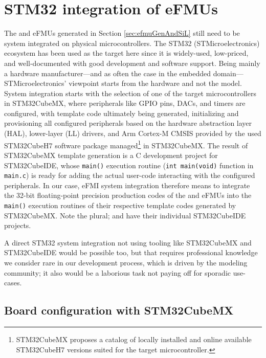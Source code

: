 \section{STM32 integration of eFMUs}\label{sec:STM32-integration-of-eFMUs}

The \controller{} and \plant{} eFMUs generated in Section \ref{sec:efmuGenAndSiL} still need to be system integrated on physical microcontrollers. The STM32 (STMicroelectronics\regtm{}) ecosystem has been used as the target here since it is widely-used, low-priced, and well-documented with good development and software support. Being mainly a hardware manufacturer---and as often the case in the embedded domain---STMicroelectronics' viewpoint starts from the hardware and not the model. System integration starts with the selection of one of the target microcontrollers in STM32CubeMX, where peripherals like GPIO pins, DACs, and timers are configured, with template code ultimately being generated, initializing and provisioning all configured peripherals based on the hardware abstraction layer (HAL), lower-layer (LL) drivers, and Arm\regtm{} Cortex\regtm{}-M CMSIS provided by the used STM32CubeH7 software package managed\footnote{STM32CubeMX proposes a catalog of locally installed and online available STM32CubeH7 versions suited for the target microcontroller.} in STM32CubeMX. The result of STM32CubeMX template generation is a C development project for STM32CubeIDE, whose \texttt{main()} execution routine (\texttt{int main(void)} function in \texttt{main.c}) is ready for adding the actual user-code interacting with the configured peripherals. In our case, eFMI system integration therefore means to integrate the 32-bit floating-point precision production codes of the \controller{} and \plant{} eFMUs into the \texttt{main()} execution routines of their respective template codes generated by STM32CubeMX. Note the plural; \controller{} and \plant{} have their individual STM32CubeIDE projects.

A direct STM32 system integration not using tooling like STM32CubeMX and STM32CubeIDE would be possible too, but that requires professional knowledge we consider rare in our development process, which is driven by the modeling community; it also would be a laborious task not paying off for sporadic use-cases.

\subsection{Board configuration with STM32CubeMX}\label{sec:STM32CubeMX}

